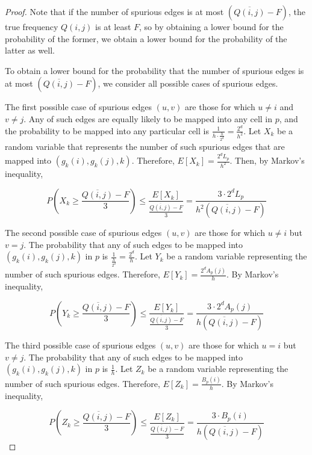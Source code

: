 \begin{proof}
Note that if the number of spurious edges is at most $(\overline{Q(i,j)} - F)$, the true frequency $Q(i,j)$ is at least $F$, so by obtaining a lower bound for the probability of the former, we obtain a lower bound for the probability of the latter as well.

To obtain a lower bound for the probability that the number of spurious edges is at most $(\overline{Q(i,j)} - F)$, we consider all possible cases of spurious edges.

The first possible case of spurious edges $(u,v)$ are those for which $u \neq i$ and $v \neq j$. Any of such edges are equally likely to be mapped into any cell in $p$, and the probability to be mapped into any particular cell is $\frac{1}{h \cdot \frac{h}{2^d}} = \frac{2^d}{h^2}$. Let $X_k$ be a random variable that represents the number of such spurious edges that are mapped into $(g_k(i),g_k(j),k)$. Therefore, $E[X_k] = \frac{2^dL_p}{h^2}$. Then, by Markov's inequality,

\begin{equation} \label{hh1}
P(X_k \geq \frac{\overline{Q(i,j)}-F}{3}) \leq \frac{E[X_k]}{\frac{\overline{Q(i,j)}-F}{3}} = \frac{3\cdot2^dL_p}{h^2(\overline{Q(i,j)}-F)}
\end{equation}

The second possible case of spurious edges $(u,v)$ are those for which $u \neq i$ but $v=j$. The probability that any of such edges to be mapped into $(g_k(i),g_k(j),k)$ in $p$ is $\frac{1}{\frac{h}{2^d}} = \frac{2^d}{h}$. Let $Y_k$ be a random variable representing the number of such spurious edges. Therefore, $E[Y_k] = \frac{2^dA_p(j)}{h}$. By Markov's inequality,

\begin{equation} \label{hh2}
P(Y_k \geq \frac{\overline{Q(i,j)}-F}{3}) \leq \frac{E[Y_k]}{\frac{\overline{Q(i,j)}-F}{3}} = \frac{3\cdot2^dA_p(j)}{h(\overline{Q(i,j)}-F)}
\end{equation}

The third possible case of spurious edges $(u,v)$ are those for which $u=i$ but $v \neq j$. The probability that any of such edges to be mapped into $(g_k(i),g_k(j),k)$ in $p$ is $\frac{1}{h}$. Let $Z_k$ be a random variable representing the number of such spurious edges. Therefore, $E[Z_k] = \frac{B_p(i)}{h}$. By Markov's inequality,

\begin{equation} \label{hh3}
P(Z_k \geq \frac{\overline{Q(i,j)}-F}{3}) \leq \frac{E[Z_k]}{\frac{\overline{Q(i,j)}-F}{3}} = \frac{3\cdot B_p(i)}{h(\overline{Q(i,j)}-F)}
\end{equation}


\end{proof}

